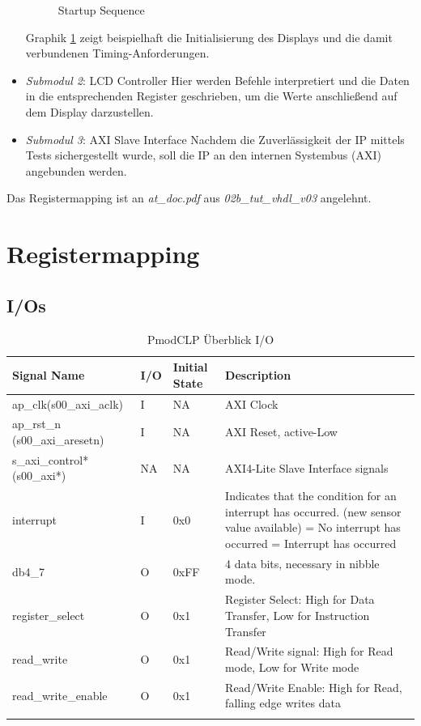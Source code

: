 \begin{itemize}
\begin{figure}[h!]
\begin{minipage}{0.15\textwidth}
        \end{minipage}
        \caption{Startup Sequence}
        \label{fig:startup_sequence}
    \end{figure}
    \newline
    Graphik \ref{fig:startup_sequence} zeigt beispielhaft die Initialisierung des Displays und die damit verbundenen Timing-Anforderungen.
    \item \textit{Submodul 2}: LCD Controller  \newline
    Hier werden Befehle interpretiert und die Daten in die entsprechenden Register geschrieben, um die Werte anschließend auf dem Display darzustellen.
    \item \textit{Submodul 3}: AXI Slave Interface  \newline
    Nachdem die Zuverlässigkeit der IP mittels Tests sichergestellt wurde, soll die IP an den internen Systembus (AXI) angebunden werden.
\end{itemize}

Das Registermapping ist an \textit{at\_doc.pdf} aus \textit{02b\_tut\_vhdl\_v03} angelehnt.

\section{Registermapping}

\subsection{I/Os}
\begin{longtable}{|p{4cm}|p{1cm}|p{2cm}|p{6.6cm}|}
\hline
\textbf{Signal Name} & \textbf{I/O} & \textbf{Initial State} & \textbf{Description} \\
\hline
ap\_clk(s00\_axi\_aclk) & I & NA & AXI Clock \\
\hline
ap\_rst\_n (s00\_axi\_aresetn) & I & NA & AXI Reset, active-Low \\
\hline
s\_axi\_control* (s00\_axi*) & NA & NA & AXI4-Lite Slave Interface signals \\
\hline
interrupt & I & 0x0 & Indicates that the condition for an interrupt has occurred. (new sensor value available)
\newline 0 = No interrupt has occurred
\newline 1 = Interrupt has occurred \\
\hline
db4\_7 & O & 0xFF & 4 data bits, necessary in nibble mode. \\
\hline
register\_select & O & 0x1 & Register Select: High for Data Transfer, Low for Instruction Transfer \\
\hline
read\_write & O & 0x1 & Read/Write signal: High for Read mode, Low for Write mode \\
\hline
read\_write\_enable & O & 0x1 & Read/Write Enable: High for Read, falling edge writes data \\
\hline
\caption{PmodCLP Überblick I/O}
\end{longtable}

